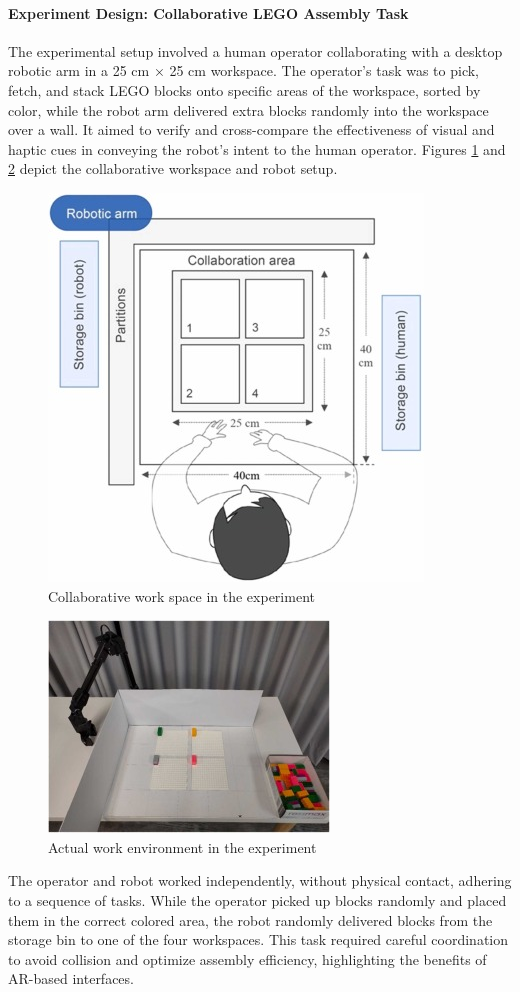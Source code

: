 \begin{enumerate}
    \paragraph{\textbf{Experiment Design: Collaborative LEGO Assembly Task}}
    The experimental setup involved a human operator collaborating with a desktop robotic arm in a 25 cm × 25 cm workspace. The operator's task was to pick, fetch, and stack LEGO blocks onto specific areas of the workspace, sorted by color, while the robot arm delivered extra blocks randomly into the workspace over a wall. It aimed to verify and cross-compare the effectiveness of visual and haptic cues in conveying the robot’s intent to the human operator. Figures \ref{f:area-1} and \ref{f:robot-area-1} depict the collaborative workspace and robot setup.

    \begin{figure}[!htpb]
        \centering
        \includegraphics[width=0.4\linewidth]{figs/area-1.jpg}
        \caption{Collaborative work space in the experiment \cite{CHU2023313}}
        \label{f:area-1}
    \end{figure}

    \begin{figure}[!htpb]
        \centering
        \includegraphics[width=0.4\linewidth]{figs/robot-area-1.jpg}
        \caption{Actual work environment in the experiment \cite{CHU2023313}}
        \label{f:robot-area-1}
    \end{figure}

    The operator and robot worked independently, without physical contact, adhering to a sequence of tasks. While the operator picked up blocks randomly and placed them in the correct colored area, the robot randomly delivered blocks from the storage bin to one of the four workspaces. This task required careful coordination to avoid collision and optimize assembly efficiency, highlighting the benefits of \ac{AR}-based interfaces.


\end{enumerate}
